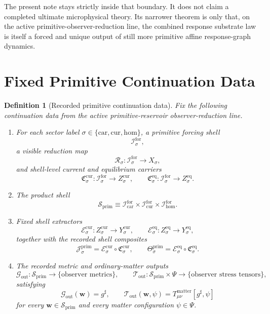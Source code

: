 \documentclass[11pt]{article}
\newcommand{\CompletedMetric}{g^{\sharp}}
\newcommand{\Car}{\mathrm{car}}
\newcommand{\Cur}{\mathrm{cur}}
\newcommand{\Hom}{\mathrm{hom}}
\newcommand{\ForSpace}[1]{\mathcal I_{#1}^{\mathrm{for}}}
\newcommand{\PrimShell}{\mathcal S_{\mathrm{prim}}}
\newcommand{\Reduction}[1]{\mathcal R_{#1}}
\newcommand{\CurrentCarrier}[1]{\mathfrak C_{#1}^{\mathrm{cur}}}
\newcommand{\EqCarrier}[1]{\mathfrak C_{#1}^{\mathrm{eq}}}
\newcommand{\CurrentExtract}[1]{\mathscr E_{#1}^{\mathrm{cur}}}
\newcommand{\EqExtract}[1]{\mathscr E_{#1}^{\mathrm{eq}}}
\newcommand{\PrimCurrent}[1]{\mathcal J_{#1}^{\mathrm{prim}}}
\newcommand{\PrimTheta}[1]{\Theta_{#1}^{\mathrm{prim}}}
\newcommand{\MetricOut}{\mathscr G_{\mathrm{out}}}
\newcommand{\MatterOut}{\mathscr T_{\mathrm{out}}}
\newtheorem{definition}{Definition}
\begin{document}
The present note stays strictly inside that boundary. It does not claim a completed ultimate microphysical theory. Its narrower theorem is only that, on the active primitive-observer-reduction line, the combined response substrate law is itself a forced and unique output of still more primitive affine response-graph dynamics.

\section{Fixed Primitive Continuation Data}

\begin{definition}[Recorded primitive continuation data]
\label{def:fixed}
Fix the following continuation data from the active primitive-reservoir observer-reduction line.
\begin{enumerate}
    \item For each sector label \(\sigma\in\{\Car,\Cur,\Hom\}\), a primitive forcing shell
    \[
    \ForSpace{\sigma},
    \]
    a visible reduction map
    \[
    \Reduction{\sigma}:\ForSpace{\sigma}\to X_{\sigma},
    \]
    and shell-level current and equilibrium carriers
    \[
    \CurrentCarrier{\sigma}:\ForSpace{\sigma}\to Z_{\sigma}^{\mathrm{cur}},
    \qquad
    \EqCarrier{\sigma}:\ForSpace{\sigma}\to Z_{\sigma}^{\mathrm{eq}}.
    \]
    \item The product shell
    \[
    \PrimShell
    \equiv
    \ForSpace{\Car}\times \ForSpace{\Cur}\times \ForSpace{\Hom}.
    \]
    \item Fixed shell extractors
    \[
    \CurrentExtract{\sigma}:Z_{\sigma}^{\mathrm{cur}}\to Y_{\sigma}^{\mathrm{cur}},
    \qquad
    \EqExtract{\sigma}:Z_{\sigma}^{\mathrm{eq}}\to Y_{\sigma}^{\mathrm{eq}},
    \]
    together with the recorded shell composites
    \begin{equation}
    \PrimCurrent{\sigma}
    =
    \CurrentExtract{\sigma}\circ \CurrentCarrier{\sigma},
    \qquad
    \PrimTheta{\sigma}
    =
    \EqExtract{\sigma}\circ \EqCarrier{\sigma}.
    \label{eq:primcomposites}
    \end{equation}
    \item The recorded metric and ordinary-matter outputs
    \[
    \MetricOut:\PrimShell\to\{\text{observer metrics}\},
    \qquad
    \MatterOut:\PrimShell\times\Psi\to\{\text{observer stress tensors}\},
    \]
    satisfying
    \begin{equation}
    \MetricOut(\mathbf w)=\CompletedMetric,
    \qquad
    \MatterOut(\mathbf w,\psi)
    =
    T_{\mu\nu}^{\mathrm{matter}}[\CompletedMetric,\psi]
    \label{eq:fixedoutputs}
    \end{equation}
    for every \(\mathbf w\in\PrimShell\) and every matter configuration \(\psi\in\Psi\).
\end{enumerate}
\end{definition}
\end{document}
